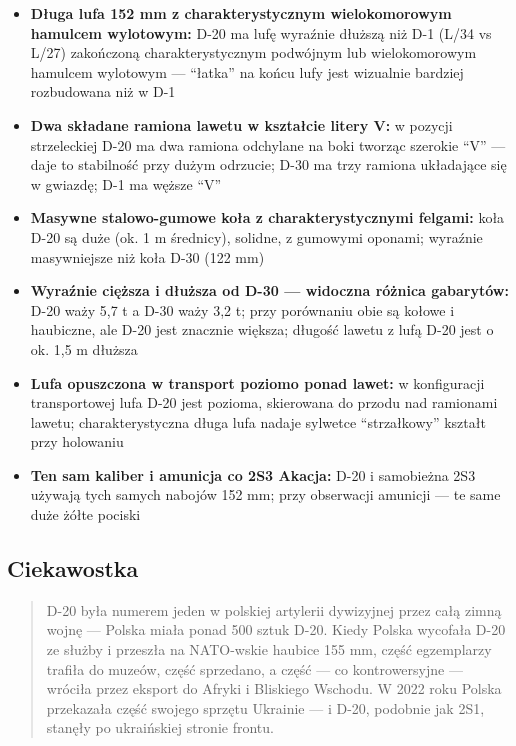 \documentclass[12pt,oneside]{book}
\providecommand{\tightlist}{%
  \setlength{\itemsep}{0pt}\setlength{\parskip}{0pt}}
\begin{document}
\begin{itemize}
\tightlist
\item
  \textbf{Długa lufa 152 mm z charakterystycznym wielokomorowym hamulcem
  wylotowym:} D-20 ma lufę wyraźnie dłuższą niż D-1 (L/34 vs L/27)
  zakończoną charakterystycznym podwójnym lub wielokomorowym hamulcem
  wylotowym --- ``łatka'' na końcu lufy jest wizualnie bardziej
  rozbudowana niż w D-1
\item
  \textbf{Dwa składane ramiona lawetu w kształcie litery V:} w pozycji
  strzeleckiej D-20 ma dwa ramiona odchylane na boki tworząc szerokie
  ``V'' --- daje to stabilność przy dużym odrzucie; D-30 ma trzy ramiona
  układające się w gwiazdę; D-1 ma węższe ``V''
\item
  \textbf{Masywne stalowo-gumowe koła z charakterystycznymi felgami:}
  koła D-20 są duże (ok. 1 m średnicy), solidne, z gumowymi oponami;
  wyraźnie masywniejsze niż koła D-30 (122 mm)
\item
  \textbf{Wyraźnie cięższa i dłuższa od D-30 --- widoczna różnica
  gabarytów:} D-20 waży 5,7 t a D-30 waży 3,2 t; przy porównaniu obie są
  kołowe i haubiczne, ale D-20 jest znacznie większa; długość lawetu z
  lufą D-20 jest o ok. 1,5 m dłuższa
\item
  \textbf{Lufa opuszczona w transport poziomo ponad lawet:} w
  konfiguracji transportowej lufa D-20 jest pozioma, skierowana do
  przodu nad ramionami lawetu; charakterystyczna długa lufa nadaje
  sylwetce ``strzałkowy'' kształt przy holowaniu
\item
  \textbf{Ten sam kaliber i amunicja co 2S3 Akacja:} D-20 i samobieżna
  2S3 używają tych samych nabojów 152 mm; przy obserwacji amunicji ---
  te same duże żółte pociski
\end{itemize}

\subsection{Ciekawostka}\label{ciekawostka-30}

\begin{quote}
D-20 była numerem jeden w polskiej artylerii dywizyjnej przez całą zimną
wojnę --- Polska miała ponad 500 sztuk D-20. Kiedy Polska wycofała D-20
ze służby i przeszła na NATO-wskie haubice 155 mm, część egzemplarzy
trafiła do muzeów, część sprzedano, a część --- co kontrowersyjne ---
wróciła przez eksport do Afryki i Bliskiego Wschodu. W 2022 roku Polska
przekazała część swojego sprzętu Ukrainie --- i D-20, podobnie jak 2S1,
stanęły po ukraińskiej stronie frontu.
\end{quote}
\end{document}
